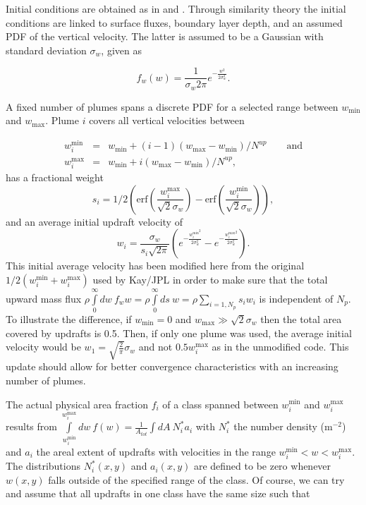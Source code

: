 \documentclass[dvipdfmx,a4paper,10pt]{article}
\begin{document}
Initial conditions are obtained as in \cite{cheinet03a} and \cite{lenschow80}. Through similarity theory the initial conditions are linked to surface fluxes, boundary layer depth, and an assumed PDF of the vertical velocity. The latter is assumed to be a Gaussian with standard deviation $\sigma_w$, given as

\begin{equation}
 f_w(w) = \frac{1}{\sigma_w 2 \pi } e^{-\frac{w^2}{2\sigma_w^2}}.
\end{equation}


A fixed number of plumes spans a discrete PDF for a selected range between $w_{\mathrm{min}}$ and $w_{\mathrm{max}}$. Plume $i$ covers all vertical velocities between

\begin{eqnarray}
 w_i^{\mathrm{min}}&=&w_{\mathrm{min}}+(i-1)(w_{\mathrm{max}}-w_{\mathrm{min}})/N^{up} \qquad\mathrm{and}\\
 w_i^{\mathrm{max}}&=&w_{\mathrm{min}}+i(w_{\mathrm{max}}-w_{\mathrm{min}})/N^{up},
\end{eqnarray}
has a fractional weight  
\begin{equation}
 s_i =1/2(\mathrm{erf}(\frac{w_i^{\mathrm{max}}}{\sqrt{2}\sigma_w}) - \mathrm{erf}(\frac{w_i^{\mathrm{min}}}{\sqrt{2}\sigma_w})),
\end{equation}
and an average initial updraft velocity of 
\begin{equation}
 w_i =   \frac{\sigma_w}{s_i \sqrt{2 \pi }} (e^{-\frac{{w_i^{\mathrm{min}}}^2}{2 \sigma_w^2}}- e^{-\frac{{w_i^{\mathrm{max}}}^2}{2 \sigma_w^2}}).
\end{equation}
This initial average velocity has been modified here from the original $1/2(w_i^{\mathrm{min}}+w_i^{\mathrm{max}})$ used by Kay/JPL in order to make sure that the total upward mass flux $\rho \int\limits_0^{\infty} dw~f_w w = \rho \int\limits_0^{\infty} ds~ w=\rho \sum_{i=1,N_p} s_i w_i $ is independent of $N_p$. To illustrate the difference, if $w_{\mathrm{min}}=0$ and $w_{\mathrm{max}}\gg\sqrt{2}\sigma_w$ then the total area covered by updrafts is 0.5. Then, if only one plume was used, the average initial velocity would be $w_1=\sqrt{\frac{2}{\pi}} \sigma_w$ and not $0.5 w_i^{\mathrm{max}}$ as in the unmodified code. This update should allow for better convergence characteristics with an increasing number of plumes. 


The actual physical area fraction $f_i$ of a class spanned between $w_i^{\mathrm{min}}$ and $w_i^{\mathrm{max}}$ results from 
$\int\limits_{w_i^{\mathrm{min}}}^{w_i^{\mathrm{max}}} dw~ f(w) =\frac{1}{A_{tot}}\int\limits dA~N^*_i a_i$ with $N^*_i$ the number density (m$^{-2}$) and $a_i$ the areal extent of updrafts with velocities in the range $w_i^{\mathrm{min}}<w<w_i^{\mathrm{max}}$. The distributions $N^*_i(x,y)$ and $a_i(x,y)$ are defined to be zero whenever $w(x,y)$ falls outside of the specified range of the class. Of course, we can try and assume that all updrafts in one class have the same size such that 
\end{document}
